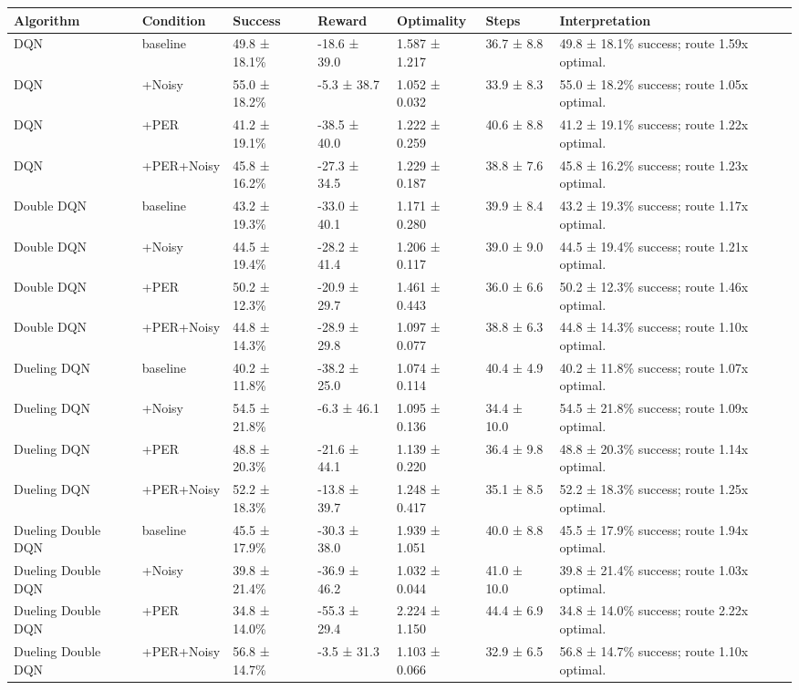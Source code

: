 \begin{tabular}{lllllll}
\toprule
Algorithm & Condition & Success & Reward & Optimality & Steps & Interpretation \\
\midrule
DQN & baseline & 49.8 ± 18.1\% & -18.6 ± 39.0 & 1.587 ± 1.217 & 36.7 ± 8.8 & 49.8 ± 18.1\% success; route 1.59x optimal. \\
DQN & +Noisy & 55.0 ± 18.2\% & -5.3 ± 38.7 & 1.052 ± 0.032 & 33.9 ± 8.3 & 55.0 ± 18.2\% success; route 1.05x optimal. \\
DQN & +PER & 41.2 ± 19.1\% & -38.5 ± 40.0 & 1.222 ± 0.259 & 40.6 ± 8.8 & 41.2 ± 19.1\% success; route 1.22x optimal. \\
DQN & +PER+Noisy & 45.8 ± 16.2\% & -27.3 ± 34.5 & 1.229 ± 0.187 & 38.8 ± 7.6 & 45.8 ± 16.2\% success; route 1.23x optimal. \\
Double DQN & baseline & 43.2 ± 19.3\% & -33.0 ± 40.1 & 1.171 ± 0.280 & 39.9 ± 8.4 & 43.2 ± 19.3\% success; route 1.17x optimal. \\
Double DQN & +Noisy & 44.5 ± 19.4\% & -28.2 ± 41.4 & 1.206 ± 0.117 & 39.0 ± 9.0 & 44.5 ± 19.4\% success; route 1.21x optimal. \\
Double DQN & +PER & 50.2 ± 12.3\% & -20.9 ± 29.7 & 1.461 ± 0.443 & 36.0 ± 6.6 & 50.2 ± 12.3\% success; route 1.46x optimal. \\
Double DQN & +PER+Noisy & 44.8 ± 14.3\% & -28.9 ± 29.8 & 1.097 ± 0.077 & 38.8 ± 6.3 & 44.8 ± 14.3\% success; route 1.10x optimal. \\
Dueling DQN & baseline & 40.2 ± 11.8\% & -38.2 ± 25.0 & 1.074 ± 0.114 & 40.4 ± 4.9 & 40.2 ± 11.8\% success; route 1.07x optimal. \\
Dueling DQN & +Noisy & 54.5 ± 21.8\% & -6.3 ± 46.1 & 1.095 ± 0.136 & 34.4 ± 10.0 & 54.5 ± 21.8\% success; route 1.09x optimal. \\
Dueling DQN & +PER & 48.8 ± 20.3\% & -21.6 ± 44.1 & 1.139 ± 0.220 & 36.4 ± 9.8 & 48.8 ± 20.3\% success; route 1.14x optimal. \\
Dueling DQN & +PER+Noisy & 52.2 ± 18.3\% & -13.8 ± 39.7 & 1.248 ± 0.417 & 35.1 ± 8.5 & 52.2 ± 18.3\% success; route 1.25x optimal. \\
Dueling Double DQN & baseline & 45.5 ± 17.9\% & -30.3 ± 38.0 & 1.939 ± 1.051 & 40.0 ± 8.8 & 45.5 ± 17.9\% success; route 1.94x optimal. \\
Dueling Double DQN & +Noisy & 39.8 ± 21.4\% & -36.9 ± 46.2 & 1.032 ± 0.044 & 41.0 ± 10.0 & 39.8 ± 21.4\% success; route 1.03x optimal. \\
Dueling Double DQN & +PER & 34.8 ± 14.0\% & -55.3 ± 29.4 & 2.224 ± 1.150 & 44.4 ± 6.9 & 34.8 ± 14.0\% success; route 2.22x optimal. \\
Dueling Double DQN & +PER+Noisy & 56.8 ± 14.7\% & -3.5 ± 31.3 & 1.103 ± 0.066 & 32.9 ± 6.5 & 56.8 ± 14.7\% success; route 1.10x optimal. \\
\bottomrule
\end{tabular}
